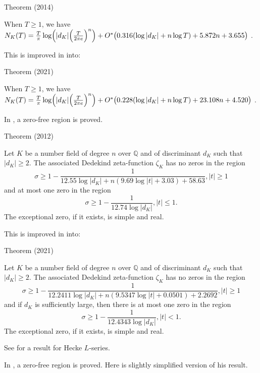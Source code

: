 \par 
\begin{thm}{Theorem (2014)}

 When $T\ge1$, we have
 $N_K(T)=\frac{T}{\pi}\log\Bigl(|d_K|\Big(\frac{T}{2\pi e}\Bigr)^n\Bigr)
 +O^*\bigl(0.316(\log |d_K|+n\log T)+5.872 n+3.655\bigr)$ .
\end{thm}


This is improved in 
\cite{Hasanalizade-Shen-Wong*21}
into:

\par 
\begin{thm}{Theorem (2021)}

 When $T\ge1$, we have
 $N_K(T)=\frac{T}{\pi}\log\Bigl(|d_K|\Big(\frac{T}{2\pi e}\Bigr)^n\Bigr)
 +O^*\bigl(0.228(\log |d_K|+n\log T)+23.108 n+4.520\bigr)$ .
\end{thm}


In
\cite{Kadiri*12},
a zero-free region is proved.

\par 
\begin{thm}{Theorem (2012)}

Let $K$ be a number field of degree $n$ over $\mathbb{Q}$ and of
discriminant $d_K$ such that $|d_K| \ge 2$. The associated Dedekind
zeta-function $\zeta_K$ has no zeros in the region
$$
\sigma\ge 1-\frac{1}{12.55\log|d_K|+n(9.69\log|t|+3.03)+58.63}, |t|\ge1
$$
and at most one zero in the region
$$
\sigma\ge 1-\frac{1}{12.74\log|d_K|}, |t|\le 1.
$$
The exceptional zero, if it exists, is simple and real.
\end{thm}

This is improved in \cite{Lee*21a} into:

\par 
\begin{thm}{Theorem (2021)}

Let $K$ be a number field of degree $n$ over $\mathbb{Q}$ and of
discriminant $d_K$ such that $|d_K| \ge 2$. The associated Dedekind
zeta-function $\zeta_K$ has no zeros in the region
$$
\sigma\ge 1-\frac{1}{12.2411\log|d_K|+n(9.5347\log|t|+0.0501)+2.2692}, |t|\ge1 
$$
and if $d_K$ is sufficiently large, then there is at most one zero in the region
$$
\sigma\ge 1-\frac{1}{12.4343\log|d_K|}, |t|< 1.
$$
The exceptional zero, if it exists, is simple and real.
\end{thm}

See
\cite{Ahn-Kwon*14}
for a result for Hecke $L$-series.

In
\cite{Louboutin*17},
a zero-free region is proved. Here is slightly simplified version of
his result.

